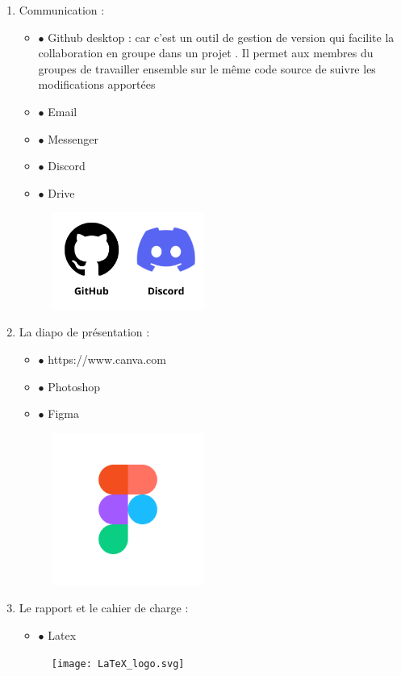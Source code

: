 \documentclass[a4paper,12pt,oneside]{article}
\begin{document}
{{\begin{enumerate}
	\item Communication : 
 		\begin{itemize}
        \item[] $\bullet$ Github desktop : car c’est un outil de gestion de version qui facilite la
collaboration en groupe dans un projet . Il permet aux membres du groupes de travailler
ensemble sur le même code source de suivre les modifications apportées
    		\item[] $\bullet$ Email
    		\item[] $\bullet$ Messenger
    		\item[] $\bullet$ Discord
    		\item[] $\bullet$ Drive     
    		\end{itemize}
    		\begin{figure}[h]
		\centering
		\includegraphics[width=5cm]{git-disc}
		\end{figure}
  	\item La diapo de présentation : 
  	 	\begin{itemize}
        \item[] $\bullet$ https://www.canva.com
        \item[] $\bullet$ Photoshop
        \item[] $\bullet$ Figma     
    		\end{itemize} 
    		\begin{figure}[h]
		\centering
		\includegraphics[width=5cm]{figma-logo-0}
		\end{figure}
	\item Le rapport et le cahier de charge :	
		\begin{itemize}
        \item[] $\bullet$ Latex
        \end{itemize}
        \begin{figure}[h]
		\centering
		\texttt{[image: LaTeX\_logo.svg]}
		\end{figure}
\end{enumerate}
}

}
\end{document}
